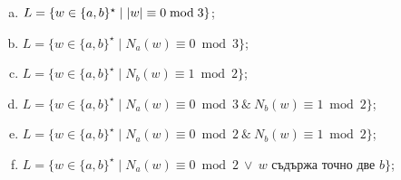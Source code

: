 \begin{problem}
\begin{enumerate}[a)]
  \item
    $L = \{w \in \{a,b\}^\star \mid \vert{w}\vert \equiv 0 \bmod 3\}$;
  \item
    $L = \{w \in \{a,b\}^\star \mid N_a(w) \equiv 0 \bmod 3\}$;
  \item
    $L = \{w \in \{a,b\}^\star \mid N_b(w) \equiv 1 \bmod 2\}$;
  \item
    $L = \{w \in \{a,b\}^\star \mid N_a(w) \equiv 0 \bmod 3\ \&\ N_b(w) \equiv 1 \bmod 2\}$;
  \item
    $L = \{w \in \{a,b\}^\star \mid N_a(w) \equiv 0 \bmod 2\ \&\ N_b(w) \equiv 1 \bmod 2\}$;
  \item
    $L = \{w \in \{a,b\}^\star \mid N_a(w) \equiv 0 \bmod 2\ \vee\ w \mbox{ съдържа точно две }b\}$;
  \end{enumerate}
\end{problem}
